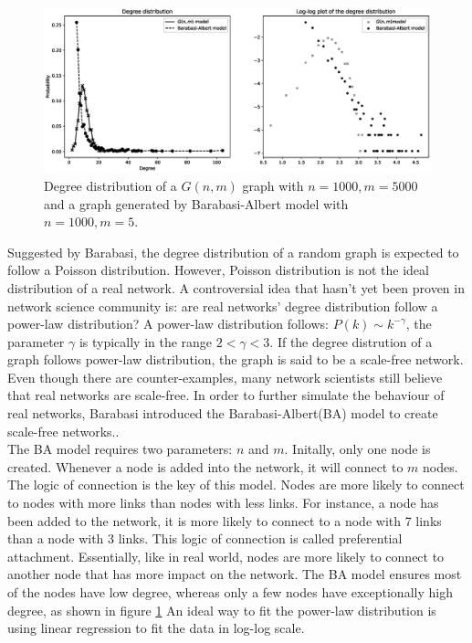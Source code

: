\documentclass[12pt]{article}
\begin{document}
\begin{figure}[ht]
    \centering
    \includegraphics[width=\textwidth]{degree_distribution.eps}
    \centering
    \caption{Degree distribution of a $G(n,m)$ graph with $n=1000,m=5000$ and a graph generated by Barabasi-Albert model with $n=1000,m=5$.}
    \label{fig:degree_dist}
\end{figure}
\noindent
Suggested by Barabasi\cite{barabási2016network}, the degree distribution of a random graph is expected to follow a Poisson distribution. However, Poisson distribution is not the ideal distribution of a real network. A controversial idea that hasn't yet been proven in network science community is: are real networks' degree distribution follow a power-law distribution?\cite{broido_clauset_2019} A power-law distribution follows: $P(k) \sim k^{-\gamma }$, the parameter $\gamma$ is typically in the range $2<\gamma<3$. If the degree distrution of a graph follows power-law distribution, the graph is said to be a scale-free network. Even though there are counter-examples, many network scientists still believe that real networks are scale-free. In order to further simulate the behaviour of real networks, Barabasi introduced the Barabasi-Albert(BA) model to create scale-free networks.\cite{barabási2016network}.\\
The BA model requires two parameters: $n$ and $m$. Initally, only one node is created. Whenever a node is added into the network, it will connect to $m$ nodes. The logic of connection is the key of this model. Nodes are more likely to connect to nodes with more links than nodes with less links. For instance, a node has been added to the network, it is more likely to connect to a node with 7 links than a node with 3 links. This logic of connection is called preferential attachment. Essentially, like in real world, nodes are more likely to connect to another node that has more impact on the network. The BA model ensures most of the nodes have low degree, whereas only a few nodes have exceptionally high degree, as shown in figure \ref{fig:degree_dist} An ideal way to fit the power-law distribution is using linear regression to fit the data in log-log scale.
\end{document}
